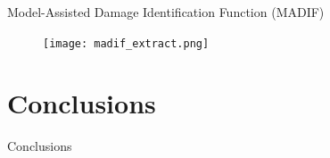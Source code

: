 \documentclass[10pt]{beamer} %
\begin{document}

	\begin{frame}[label=frame]{Model-Assisted Damage Identification Function (MADIF)}

		\begin{figure}

			\texttt{[image: madif\_extract.png]}
		\end{figure}

	\end{frame}

	\section{Conclusions}


	\begin{frame}[label=frame]{Conclusions}

		
	\end{frame}
\end{document}
